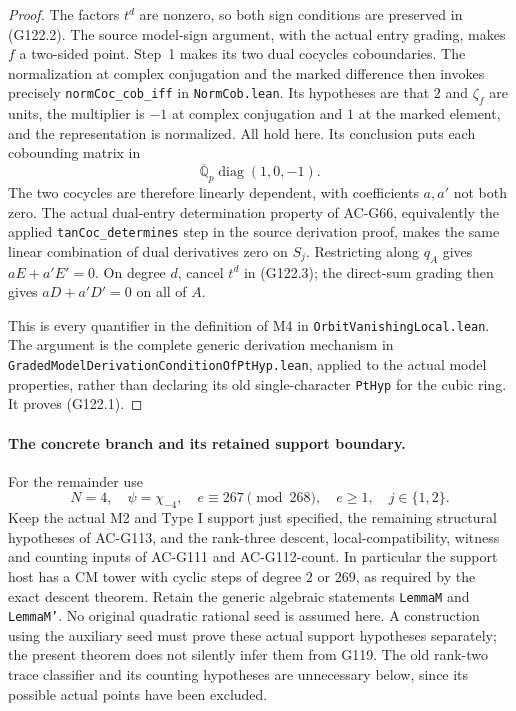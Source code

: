 \begin{proof}
The factors $t^d$ are nonzero, so both sign conditions are preserved
in (G122.2).  The source model-sign argument, with the actual entry
grading, makes $f$ a two-sided point.  Step~1 makes its two dual
cocycles coboundaries.  The normalization at complex conjugation and
the marked difference then invokes precisely
\texttt{normCoc\_cob\_iff} in \texttt{NormCob.lean}.
Its hypotheses are that $2$ and $\zeta_f$ are units, the multiplier
is $-1$ at complex conjugation and $1$ at the marked element, and
the representation is normalized.  All hold here.  Its conclusion
puts each cobounding matrix in
\[
        \overline{\mathbb Q}_p\operatorname{diag}(1,0,-1).
                                                        \tag{G122.4}
\]
The two cocycles are therefore linearly dependent, with coefficients
$a,a'$ not both zero.  The actual dual-entry determination property
of AC-G66, equivalently the applied \texttt{tanCoc\_determines}
step in the source derivation proof, makes the same linear
combination of dual derivatives zero on $S_j$.  Restricting along
$q_A$ gives $aE+a'E'=0$.  On degree $d$, cancel $t^d$ in
(G122.3); the direct-sum grading then gives
$aD+a'D'=0$ on all of $A$.

This is every quantifier in the definition of M4 in
\texttt{OrbitVanishingLocal.lean}.  The argument is the complete
generic derivation mechanism in
\texttt{GradedModelDerivationCondition\allowbreak OfPtHyp.lean}, applied to the
actual model properties, rather than declaring its old
single-character \texttt{PtHyp} for the cubic ring.  It proves
(G122.1).
\end{proof}

\paragraph{The concrete branch and its retained support boundary.}
For the remainder use
\[
        N=4,\quad\psi=\chi_{-4},\quad
        e\equiv267\pmod{268},\quad e\ge1,
        \quad j\in\{1,2\}.
                                                        \tag{G122.5}
\]
Keep the actual M2 and Type I support just specified, the remaining
structural hypotheses of AC-G113, and the rank-three descent,
local-compatibility, witness and counting inputs of AC-G111 and
AC-G112-count.  In particular the support host has a CM tower with
cyclic steps of degree $2$ or $269$, as required by the exact
descent theorem.  Retain the generic algebraic statements
\texttt{LemmaM} and \texttt{LemmaM'}.
No original quadratic rational seed is assumed here.  A construction
using the auxiliary seed must prove these actual support hypotheses
separately; the present theorem does not silently infer them from G119.
The old rank-two trace classifier and its counting hypotheses are
unnecessary below, since its possible actual points have been excluded.

